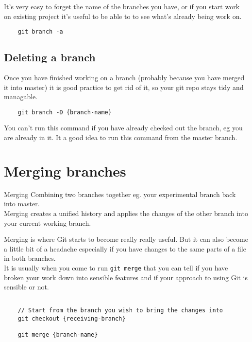 It's very easy to forget the name of the branches you have, or if you start work on existing project it's useful to be able to to see what's already being work on.

\begin{verbatim}
    git branch -a
\end{verbatim}


\subsection{Deleting a branch}

Once you have finished working on a branch (probably because you have merged it into master) it is good practice to get rid of it, so your git repo stays tidy and managable.
\\

\begin{verbatim}
    git branch -D {branch-name}
\end{verbatim}

You can't run this command if you have already checked out the branch, eg you are already in it. It a good idea to run this command from the master branch.

\section{Merging branches}

\begin{infobox}{Merging}
	Combining two branches together eg. your experimental branch back into master.
	\\ 
	
	Merging creates a unified history and applies the changes of the other branch into your current working branch.
\end{infobox}

Merging is where Git starts to become really really useful. But it can also become a little bit of a headache especially if you have changes to the same parts of a file in both branches.
\\

It is usually when you come to run \texttt{git merge} that you can tell if you have broken your work down into sensible features and if your approach to using Git is sensible or not.
\\

\begin{verbatim}

    // Start from the branch you wish to bring the changes into
    git checkout {receiving-branch}

    git merge {branch-name}
\end{verbatim}

